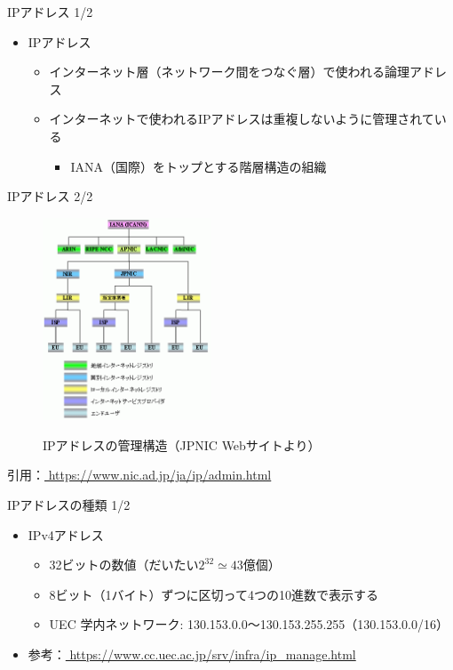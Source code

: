 \documentclass[12pt,aspectratio=169]{beamer}
\begin{document}
\begin{frame}{IPアドレス 1/2}

  \begin{itemize}
    \item IPアドレス
      \begin{itemize}
        \item インターネット層（ネットワーク間をつなぐ層）で使われる論理アドレス
        \item インターネットで使われるIPアドレスは重複しないように管理されている
          \begin{itemize}
            \item IANA（国際）をトップとする階層構造の組織
          \end{itemize}
      \end{itemize}

  \end{itemize}

\end{frame}


\begin{frame}{IPアドレス 2/2}

  \begin{figure}
    \centering
    \includegraphics[width=5cm,bb=0 0 382 460]{./figures/ipreg.png}
    \label{fig:ipreg}
    \caption{IPアドレスの管理構造（JPNIC Webサイトより）}
  \end{figure}

  \centering
  { \small 引用：\url { https://www.nic.ad.jp/ja/ip/admin.html } }

\end{frame}


\begin{frame}{IPアドレスの種類 1/2}
  \begin{itemize}
    \item IPv4アドレス
      \begin{itemize}
        \item 32ビットの数値（だいたい\( 2^{32} \simeq 43 \)億個）
        \item 8ビット（1バイト）ずつに区切って4つの10進数で表示する
        \item UEC 学内ネットワーク: 130.153.0.0〜130.153.255.255（130.153.0.0/16）
      \end{itemize}
    \item { \small 参考：\url { https://www.cc.uec.ac.jp/srv/infra/ip_manage.html } }

  \end{itemize}

\end{frame}
\end{document}
